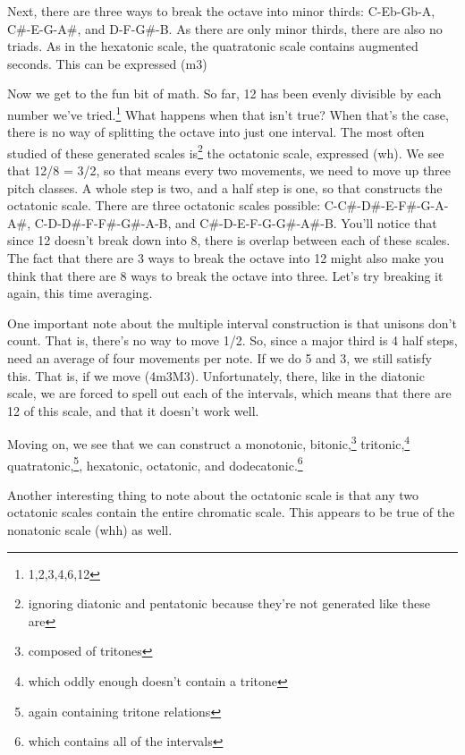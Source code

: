 \documentclass[12pt]{article}[titlepage]
\newcommand{\1}{\={a}}
\newcommand{\2}{\={e}}
\newcommand{\3}{\={\i}}
\newcommand{\4}{\=o}
\newcommand{\5}{\=u}
\newcommand{\6}{\={A}}
\renewcommand{\,}{\textsuperscript{,}}
\begin{document}
Next, there are three ways to break the octave into minor thirds: C-Eb-Gb-A, C\#-E-G-A\#, and D-F-G\#-B.
As there are only minor thirds, there are also no triads.
As in the hexatonic scale, the quatratonic scale contains augmented seconds.
This can be expressed (m3)

Now we get to the fun bit of math.
So far, 12 has been evenly divisible by each number we've tried.\footnote{1,2,3,4,6,12}
What happens when that isn't true?
When that's the case, there is no way of splitting the octave into just one interval.
The most often studied of these generated scales is\footnote{ignoring diatonic and pentatonic because they're not generated like these are} the octatonic scale, expressed (wh).
We see that 12/8 = 3/2, so that means every two movements, we need to move up three pitch classes.
A whole step is two, and a half step is one, so that constructs the octatonic scale.
There are three octatonic scales possible: C-C\#-D\#-E-F\#-G-A-A\#, C-D-D\#-F-F\#-G\#-A-B, and C\#-D-E-F-G-G\#-A\#-B.
You'll notice that since 12 doesn't break down into 8, there is overlap between each of these scales.
The fact that there are 3 ways to break the octave into 12 might also make you think that there are 8 ways to break the octave into three.
Let's try breaking it again, this time averaging.

One important note about the multiple interval construction is that unisons don't count.
That is, there's no way to move 1/2.
So, since a major third is 4 half steps, need an average of four movements per note.
If we do 5 and 3, we still satisfy this.
That is, if we move (4m3M3).
Unfortunately, there, like in the diatonic scale, we are forced to spell out each of the intervals, which means that there are 12 of this scale, and that it doesn't work well.

Moving on, we see that we can construct a monotonic, bitonic,\footnote{composed of tritones} tritonic,\footnote{which oddly enough doesn't contain a tritone} quatratonic,\footnote{again containing tritone relations}, hexatonic, octatonic, and dodecatonic.\footnote{which contains all of the intervals}

Another interesting thing to note about the octatonic scale is that any two octatonic scales contain the entire chromatic scale.
This appears to be true of the nonatonic scale (whh) as well.
\end{document}
